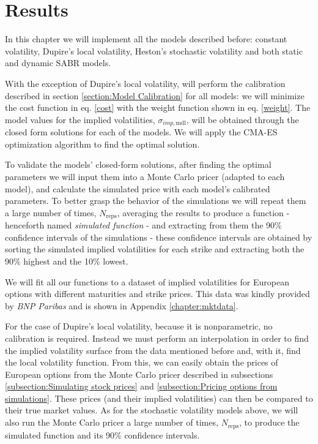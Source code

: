 \chapter{Results}
\label{chapter:results}
In this chapter we will implement all the models described before: constant volatility, Dupire's local volatility, Heston's stochastic volatility and both static and dynamic SABR models.

With the exception of Dupire's local volatility, will perform the calibration described in section \ref{section:Model Calibration} for all models: we will minimize the cost function in eq. \eqref{cost} with the weight function shown in eq. \eqref{weight}. The model values for the implied volatilities, $\sigma_{imp,\mathrm{mdl}}$, will be obtained through the closed form solutions for each of the models. We will apply the CMA-ES optimization algorithm to find the optimal solution.

To validate the models' closed-form solutions, after finding the optimal parameters we will input them into a Monte Carlo pricer (adapted to each model), and calculate the simulated price with each model's calibrated parameters. To better grasp the behavior of the simulations we will repeat them a large number of times, $N_{\mathrm{reps}}$, averaging the results to produce a function - henceforth named \emph{simulated function} -  and extracting from them the 90\% confidence intervals of the simulations - these confidence intervals are obtained by sorting the simulated implied volatilities for each strike and extracting both the 90\% highest and the 10\% lowest.


We will fit all our functions to a dataset of implied volatilities for European options with different maturities and strike prices. This data was kindly provided by \emph{BNP Paribas} and is shown in Appendix \ref{chapter:mktdata}.


For the case of Dupire's local volatility, because it is nonparametric, no calibration is required. Instead we must perform an interpolation in order to find the implied volatility surface from the data mentioned before and, with it, find the local volatility function. From this, we can easily obtain the prices of European options from the Monte Carlo pricer described in subsections \ref{subsection:Simulating stock prices} and \ref{subsection:Pricing options from simulations}. These prices (and their implied volatilities) can then be compared to their true market values. As for the stochastic volatility models above, we will also run the Monte Carlo pricer a large number of times, $N_{\mathrm{reps}}$, to produce the simulated function and its 90\% confidence intervals.



